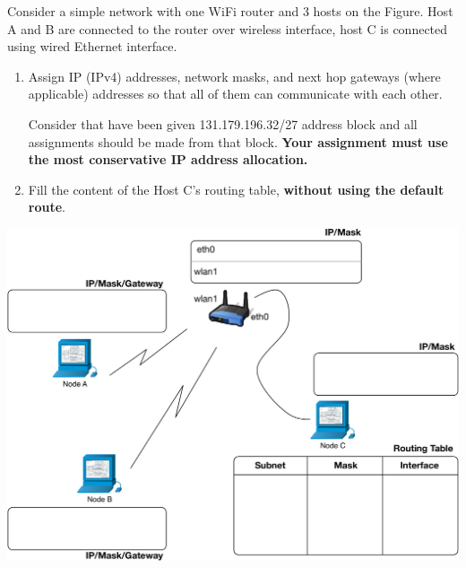 \documentclass{report}
\begin{document}
\clearpage
\begin{problem}

Consider a simple network with one WiFi router and 3 hosts on the Figure.  Host A and B are connected to the router over wireless interface, host C is connected using wired Ethernet interface.


\begin{enumerate}
\item Assign IP (IPv4) addresses, network masks, and next hop gateways (where applicable) addresses so that all of them can communicate with each other.

Consider that have been given 131.179.196.32/27 address block and all assignments should be made from that block.   \textbf{Your assignment must use the most conservative IP address allocation.}

\item Fill the content of the Host C's routing table, \textbf{without using the default route}.
\end{enumerate}

\vspace{1cm}

\includegraphics[scale=0.6]{hw6-topo}

\end{problem}
\end{document}
